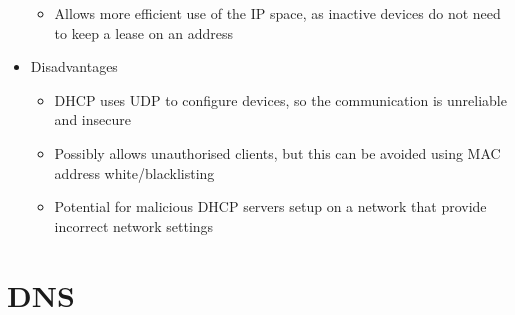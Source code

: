\begin{itemize}
\begin{itemize}
    \item Allows more efficient use of the IP space, as inactive devices do not need to keep a lease on an address
  \end{itemize}
  \item Disadvantages
  \begin{itemize}
    \item DHCP uses UDP to configure devices, so the communication is unreliable and insecure
    \item Possibly allows unauthorised clients, but this can be avoided using MAC address white/blacklisting
    \item Potential for malicious DHCP servers setup on a network that provide incorrect network settings
  \end{itemize}
\end{itemize}

\section*{DNS}


